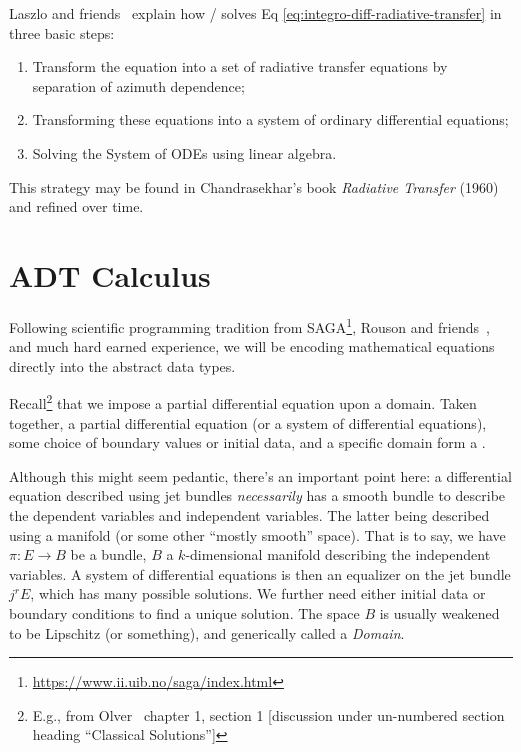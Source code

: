 \begin{note}
Laszlo and friends~\cite{Laszlo2016} explain how \DISORT/ solves Eq
\eqref{eq:integro-diff-radiative-transfer} in three basic steps:
\begin{enumerate}
\item Transform the equation into a set of radiative transfer equations
  by separation of azimuth dependence;
\item Transforming these equations into a system of ordinary
  differential equations;
\item Solving the System of ODEs using linear algebra.
\end{enumerate}
This strategy may be found in Chandrasekhar's book
\emph{Radiative Transfer} (1960) and refined over time.
\end{note}

\section{ADT Calculus}

Following scientific programming tradition from SAGA\footnote{\url{https://www.ii.uib.no/saga/index.html}},
Rouson and friends~\cite{rouson2011scientific,rouson2008grid}, and much
hard earned experience, we will be encoding mathematical equations
directly into the abstract data types.

Recall\footnote{E.g., from Olver~\cite{olver2014introduction} chapter 1,
section 1 [discussion under un-numbered section heading ``Classical
  Solutions'']} that we impose a partial differential equation upon a
domain. Taken together, a partial differential equation (or a system of
differential equations), some choice of boundary values or initial data,
and a specific domain form a .

\begin{rmk}
Although this might seem pedantic, there's an important point here: a
differential equation described using jet bundles \emph{necessarily} has
a smooth bundle to describe the dependent variables and independent
variables. The latter being described using a manifold (or some other
``mostly smooth'' space). That is to say, we have $\pi\colon E\to B$ be
a bundle, $B$ a $k$-dimensional manifold describing the independent
variables. A system of differential equations is then an equalizer
on the jet bundle $j^{r}E$, which has many possible solutions. We
further need either initial data or boundary conditions to find a unique
solution. The space $B$ is usually weakened to be Lipschitz (or
something), and generically called a \emph{Domain}.
\end{rmk}

